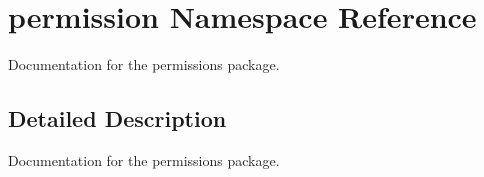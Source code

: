 \hypertarget{namespacepermission}{}\section{permission Namespace Reference}
\label{namespacepermission}


Documentation for the permissions package.  




\subsection{Detailed Description}
Documentation for the permissions package. 